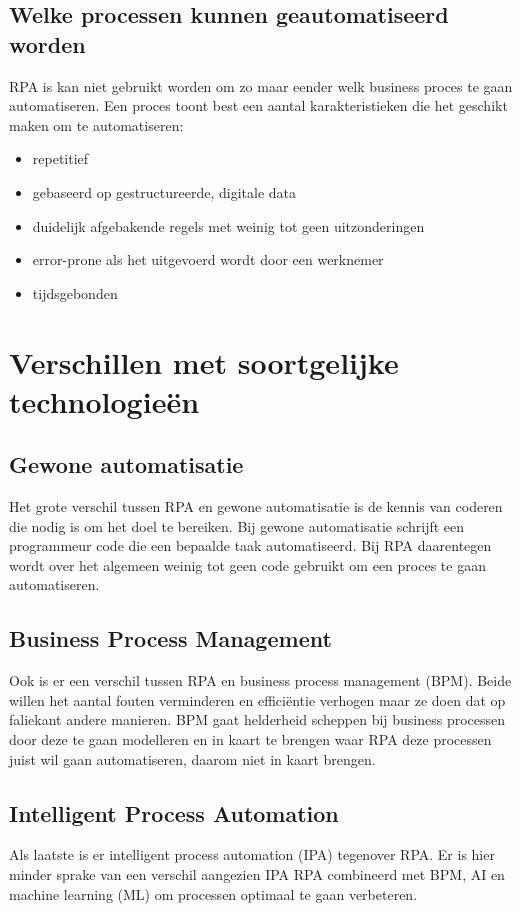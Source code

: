 \subsection{Welke processen kunnen geautomatiseerd worden}
RPA is kan niet gebruikt worden om zo maar eender welk business proces te gaan automatiseren. Een proces toont best een aantal karakteristieken die het geschikt maken om te automatiseren:
\begin{itemize}
	\item repetitief
	\item gebaseerd op gestructureerde, digitale data
	\item duidelijk afgebakende regels met weinig tot geen uitzonderingen
	\item error-prone als het uitgevoerd wordt door een werknemer
	\item tijdsgebonden
\end{itemize}

\section{Verschillen met soortgelijke technologieën}

\subsection{Gewone automatisatie}
Het grote verschil tussen RPA en gewone automatisatie is de kennis van coderen die nodig is om het doel te bereiken. Bij gewone automatisatie schrijft een programmeur code die een bepaalde taak automatiseerd. Bij RPA daarentegen wordt over het algemeen weinig tot geen code gebruikt om een proces te gaan automatiseren.
\subsection{Business Process Management}
Ook is er een verschil tussen RPA en business process management (BPM). Beide willen het aantal fouten verminderen en efficiëntie verhogen maar ze doen dat op faliekant andere manieren. BPM gaat helderheid scheppen bij business processen door deze te gaan modelleren en in kaart te brengen waar RPA deze processen juist wil gaan automatiseren, daarom niet in kaart brengen.
\subsection{Intelligent Process Automation}
Als laatste is er intelligent process automation (IPA) tegenover RPA. Er is hier minder sprake van een verschil aangezien IPA RPA combineerd met BPM, AI en machine learning (ML) om processen optimaal te gaan verbeteren.
\autocite{everythingRPA}

